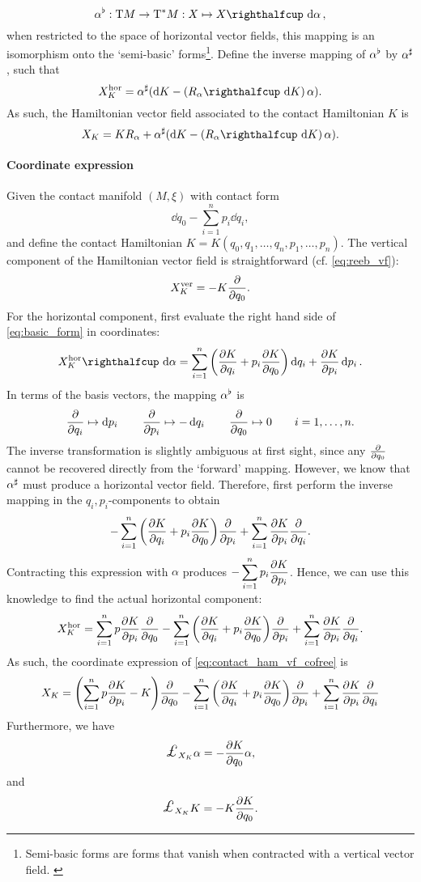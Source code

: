 $$ \toDual{\alpha}: \tbundle{M} \to \ctbundle{M}: X \mapsto  \intpr{X}{\dd{\alpha}},$$
when restricted to the space of horizontal vector fields, this mapping is an isomorphism onto the `semi-basic' forms\footnote{Semi-basic forms are forms that vanish when contracted with a vertical vector field. \cite{Libermann1987}}. Define the inverse mapping of $\alpha^\flat$ by $\alpha^\sharp$, such that
$$ X_K^\text{hor} = \fromDual{\alpha}\qty(\dd{K} - \qty(\intpr{R_\alpha}{\dd{K}})\,\alpha). $$
As such, the Hamiltonian vector field associated to the contact Hamiltonian $K$ is
\begin{equation}
    X_K = K R_\alpha + \fromDual{\alpha}(\dd{K} - \qty(\intpr{R_\alpha}{\dd{K}})\,\alpha).
    \label{eq:contact_ham_vf_cofree}
\end{equation}

\paragraph{Coordinate expression} Given the contact manifold $(M, \xi)$ with contact form
$$ \dd{q_0} - \sum_{i = 1}^n p_i\dd{q_i}, $$
and define the contact Hamiltonian $K = K(q_0, q_1, \ldots, q_n, p_1, \ldots, p_n)$. 
The vertical component of the Hamiltonian vector field is straightforward (cf. \cref{eq:reeb_vf}): 
$$ X_K^\text{ver} = -K\pdv{}{q_0}. $$
For the horizontal component, first evaluate the right hand side of \cref{eq:basic_form} in coordinates:
$$ \intpr{X_K^\text{hor}}{\dd{\alpha}} =  \sum_{i = 1}^n \qty(\pdv{K}{q_i} + p_i \pdv{K}{q_0})\dd{q_i} + \pdv{K}{p_i}\dd{p_i}. $$
In terms of the basis vectors, the mapping $\alpha^\flat$ is
$$ \pdv{}{q_i} \mapsto \dd{p_i} \qquad \pdv{}{p_i} \mapsto -\dd{q_i} \qquad \pdv{}{q_0} \mapsto 0 \qquad i = 1, \ldots, n.$$
The inverse transformation is slightly ambiguous at first sight, since any $\pdv{}{q_0}$ cannot be recovered directly from the `forward' mapping. However, we know that $\alpha^\sharp$ must produce a horizontal vector field. Therefore, first perform the inverse mapping in the $q_i, p_i$-components to obtain
$$ - \sum_{i = 1}^n \qty(\pdv{K}{q_i} + p_i \pdv{K}{q_0})\pdv{}{p_i} + \sum_{i=1}^n \pdv{K}{p_i}\pdv{}{q_i}. $$
Contracting this expression with $\alpha$ produces $\displaystyle - \sum_{i=1}^n p_i\pdv{K}{p_i} $. Hence, we can use this knowledge to find the actual horizontal component:
$$ X_K^\text{hor} = \sum_{i=1}^n p\pdv{K}{p_i} \pdv{}{q_0}- \sum_{i = 1}^n \qty(\pdv{K}{q_i} + p_i \pdv{K}{q_0})\pdv{}{p_i} + \sum_{i=1}^n \pdv{K}{p_i}\pdv{}{q_i}. $$
As such, the coordinate expression of \cref{eq:contact_ham_vf_cofree} is 
\begin{equation}
    X_K = \qty(\sum_{i=1}^n p\pdv{K}{p_i} - K) \pdv{}{q_0}- \sum_{i = 1}^n \qty(\pdv{K}{q_i} + p_i \pdv{K}{q_0})\pdv{}{p_i} + \sum_{i=1}^n \pdv{K}{p_i}\pdv{}{q_i}
\end{equation}
Furthermore, we have
$$ \lied{X_K} \alpha = - \pdv{K}{q_0} \alpha, $$ 
and 
$$ \lied{X_K} K = - K\pdv{K}{q_0}.  $$ 

